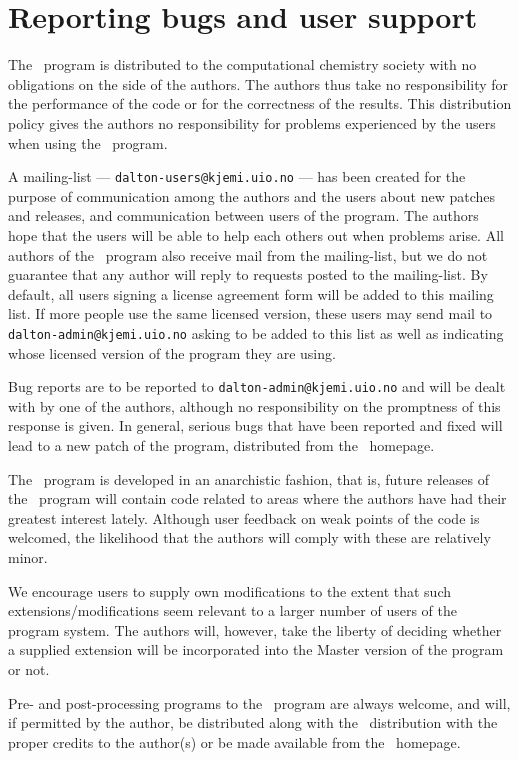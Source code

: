 \section{Reporting bugs and user support}

The \dalton\ program is distributed to the computational chemistry
society with no obligations on the side of the
authors. The authors thus take no responsibility
for the performance
of the code or for the correctness of the
results. This distribution
policy gives the authors no responsibility for problems experienced by
the users when using the \dalton\ program.

A mailing-list ---
\verb|dalton-users@kjemi.uio.no| --- has been created for
the purpose of communication among the authors and the users about
new patches and releases, and communication between users of the
program. The authors hope that the
users will be able to help each others out when problems
arise. All authors of the \dalton\ program also receive mail from the
mailing-list, but we do not guarantee that any author will reply to
requests posted to the mailing-list. By default, all users signing a
license agreement form will be added to this mailing list. If more
people use the same licensed version, these users may send mail to
\verb|dalton-admin@kjemi.uio.no| asking to be added to this list as
well as indicating whose licensed version of the program they are using.

Bug reports are to be reported to \verb|dalton-admin@kjemi.uio.no| and
will be dealt with by one of the authors, although no responsibility
on the promptness of this response is given. In general, serious bugs
that have been
reported and fixed will lead to a new patch of the program, distributed from the
\dalton\ homepage.

The \dalton\ program is developed in an anarchistic fashion, that is,
future releases of the \dalton\ program will contain code related to
areas where the authors have had their greatest interest
lately. Although user feedback on weak points of the code is welcomed, the
likelihood that the authors will comply with these are relatively
minor.

We encourage users to supply own modifications to
the extent that
such extensions/modifications seem relevant to a larger number of
users of the program system. The authors will, however, take the
liberty of deciding whether a supplied extension will be incorporated
into the Master version of the program or not.

Pre- and post-processing programs to the \dalton\ program are always
welcome, and will, if permitted by the author, be distributed along
with the \dalton\ distribution with the proper credits to the
author(s) or be made available from the \dalton\ homepage.
